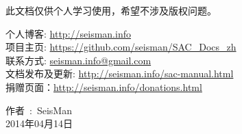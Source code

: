 此文档仅供个人学习使用，希望不涉及版权问题。

\begin{flushleft}
个人博客: \url{http://seisman.info}                         \\
项目主页: \url{https://github.com/seisman/SAC_Docs_zh}      \\
联系方式: \url{seisman.info@gmail.com}                      \\
文档发布及更新: \url{http://seisman.info/sac-manual.html}   \\
捐赠页面：\url{http://seisman.info/donations.html}          \\

\end{flushleft}

\begin{flushright}
作者~:~SeisMan \\
2014年04月14日
\end{flushright}
